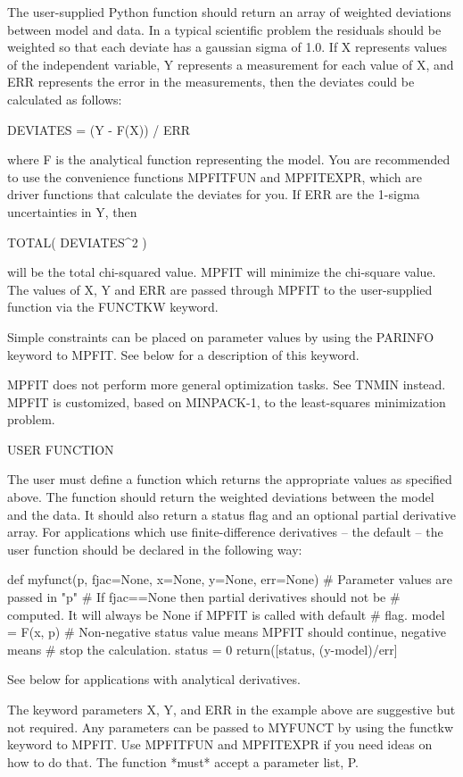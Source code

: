 \begin{DoxyVerb}
 The user-supplied Python function should return an array of weighted
 deviations between model and data.  In a typical scientific problem
 the residuals should be weighted so that each deviate has a
 gaussian sigma of 1.0.  If X represents values of the independent
 variable, Y represents a measurement for each value of X, and ERR
 represents the error in the measurements, then the deviates could
 be calculated as follows:

   DEVIATES = (Y - F(X)) / ERR

 where F is the analytical function representing the model.  You are
 recommended to use the convenience functions MPFITFUN and
 MPFITEXPR, which are driver functions that calculate the deviates
 for you.  If ERR are the 1-sigma uncertainties in Y, then

   TOTAL( DEVIATES^2 )

 will be the total chi-squared value.  MPFIT will minimize the
 chi-square value.  The values of X, Y and ERR are passed through
 MPFIT to the user-supplied function via the FUNCTKW keyword.

 Simple constraints can be placed on parameter values by using the
 PARINFO keyword to MPFIT.  See below for a description of this
 keyword.

 MPFIT does not perform more general optimization tasks.  See TNMIN
 instead.  MPFIT is customized, based on MINPACK-1, to the
 least-squares minimization problem.


                   USER FUNCTION

 The user must define a function which returns the appropriate
 values as specified above.  The function should return the weighted
 deviations between the model and the data.  It should also return a status
 flag and an optional partial derivative array.  For applications which
 use finite-difference derivatives -- the default -- the user
 function should be declared in the following way:

   def myfunct(p, fjac=None, x=None, y=None, err=None)
    # Parameter values are passed in "p"
    # If fjac==None then partial derivatives should not be
    # computed.  It will always be None if MPFIT is called with default
    # flag.
    model = F(x, p)
    # Non-negative status value means MPFIT should continue, negative means
    # stop the calculation.
    status = 0
    return([status, (y-model)/err]

 See below for applications with analytical derivatives.

 The keyword parameters X, Y, and ERR in the example above are
 suggestive but not required.  Any parameters can be passed to
 MYFUNCT by using the functkw keyword to MPFIT.  Use MPFITFUN and
 MPFITEXPR if you need ideas on how to do that.  The function *must*
 accept a parameter list, P.


\end{DoxyVerb}
